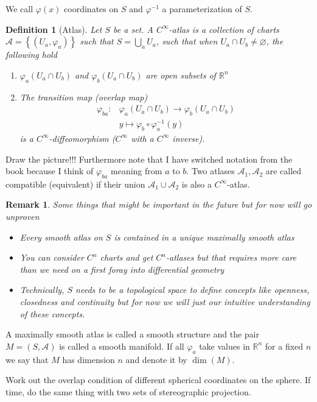 \documentclass[a4paper]{article}
\newtheorem*{defn}{Definition}
\newtheorem*{rem}{Remark}
\begin{document}
We call $\varphi(x)$ coordinates on $S$ and $\varphi^{-1}$ a parameterization of $S$.

\begin{defn}[Atlas]
  Let $S$ be a set. A $C^\infty$-atlas is a collection of charts $\mathcal{A} = \left\{ (U_a, \varphi_a) \right\}$ such that $S = \bigcup_a U_a$, such that when $U_a \cap U_b \neq \varnothing$, the following hold
  \begin{enumerate}
    \item $\varphi_a(U_a \cap U_b)$ and $\varphi_b(U_a \cap U_b)$ are open subsets of $\mathds{R}^n$
    \item The transition map (overlap map)
      \[
        \begin{aligned}
          \varphi_{ba}:& \varphi_a(U_a \cap U_b) \rightarrow \varphi_b(U_a \cap U_b) \\
                       &y \mapsto \varphi_b \circ \varphi^{-1}_a(y) 
        \end{aligned}
      \]
      is a $C^\infty$-diffeomorphism ($C^\infty$ with a $C^\infty$ inverse).
  \end{enumerate}
\end{defn}

Draw the picture!!! Furthermore note that I have switched notation from the book because I think of $\varphi_{ba}$ meaning from $a$ to $b$. Two atlases $\mathcal{A}_1, \mathcal{A}_2$ are called compatible (equivalent) if their union $\mathcal{A}_1 \cup \mathcal{A}_2$ is also a $C^\infty$-atlas.

\begin{rem}
  Some things that might be important in the future but for now will go unproven
  \begin{itemize}
    \item Every smooth atlas on $S$ is contained in a unique maximally smooth atlas
    \item You can consider $C^n$ charts and get $C^n$-atlases but that requires more care than we need on a first foray into differential geometry
    \item Technically, $S$ needs to be a topological space to define concepts like openness, closedness and continuity but for now we will just our intuitive understanding of these concepts.
  \end{itemize}
\end{rem}

A maximally smooth atlas is called a smooth structure and the pair $M = (S, \mathcal{A})$ is called a smooth manifold. If all $\varphi_a$ take values in $\mathds{R}^n$ for a fixed $n$ we say that $M$ has dimension $n$ and denote it by $\dim(M)$.

Work out the overlap condition of different spherical coordinates on the sphere. If time, do the same thing with two sets of stereographic projection.
\end{document}
